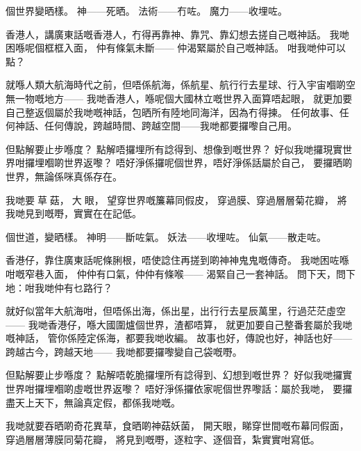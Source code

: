 個世界變晒樣。
神——死晒。
法術——冇咗。
魔力——收埋咗。

香港人，講廣東話嘅香港人，冇得再靠神、靠咒、靠幻想去搓自己嘅神話。
我哋困喺呢個框框入面，
仲有條氣未斷——
仲渴緊屬於自己嘅神話。
咁我哋仲可以點？

就喺人類大航海時代之前，但唔係航海，係航星、航行行去星球、行入宇宙嗰啲空無一物嘅地方——
我哋香港人，喺呢個大國林立嘅世界入面算唔起眼，
就更加要自己整返個屬於我哋嘅神話，包晒所有陸地同海洋，因為冇得揀。
任何故事、任何神話、任何傳說，跨越時間、跨越空間——我哋都要攞嚟自己用。

但點解要止步喺度？
點解唔攞埋所有諗得到、想像到嘅世界？
好似我哋攞現實世界咁攞埋嗰啲世界返嚟？
唔好淨係攞呢個世界，唔好淨係話屬於自己，
要攞晒啲世界，無論係咪真係存在。

我哋要󰩡草菇，󰖒大󰩡眼，
望穿世界嘅簾幕同假皮，
穿過膜、穿過層層菊花瓣，
將我哋見到嘅嘢，實實在在記低。



個世道，變晒樣。
神明——斷咗氣。
妖法——收埋咗。
仙氣——散走咗。

香港仔，靠住廣東話呢條脷根，唔使諗住再搓到啲神神鬼鬼嘅傳奇。
我哋困咗喺咁嘅窄巷入面，
仲仲有口氣，仲仲有條喉——
渴緊自己一套神話。
問下天，問下地：咁我哋仲有乜路行？

就好似當年大航海咁，但唔係出海，係出星，出行行去星辰萬里，行過茫茫虛空——
我哋香港仔，喺大國圍爐個世界，渣都唔算，
就更加要自己整番套屬於我哋嘅神話，
管你係陸定係海，都要我哋收編。
故事也好，傳說也好，神話也好——跨越古今，跨越天地——
我哋都要攞嚟變自己袋嘅嘢。

但點解要止步喺度？
點解唔乾脆攞埋所有諗得到、幻想到嘅世界？
好似我哋攞實世界咁攞埋嗰啲虛嘅世界返嚟？
唔好淨係攞依家呢個世界嚟話：屬於我哋，
要攞盡天上天下，無論真定假，都係我哋嘅。

我哋就要吞晒啲奇花異草，食晒啲神菇妖菌，
開天眼，睇穿世間嘅布幕同假面，
穿過層層薄膜同菊花瓣，
將見到嘅嘢，逐粒字、逐個音，紮實實咁寫低。